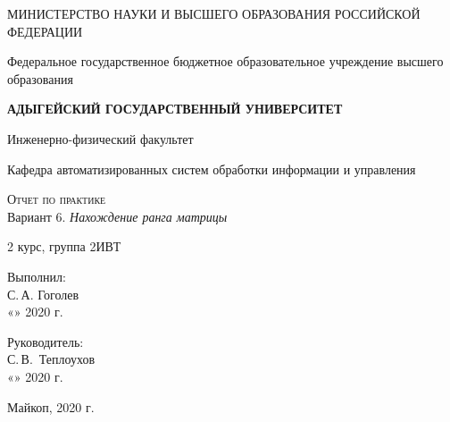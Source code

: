 \documentclass[12pt,a4paper]{scrartcl}
\begin{document}
	\begin{titlepage}
		\begin{center}
			\large
			МИНИСТЕРСТВО НАУКИ И ВЫСШЕГО ОБРАЗОВАНИЯ РОССИЙСКОЙ ФЕДЕРАЦИИ
			
			Федеральное государственное бюджетное образовательное учреждение высшего образования
			
			\textbf{АДЫГЕЙСКИЙ ГОСУДАРСТВЕННЫЙ УНИВЕРСИТЕТ}
			\vspace{0.25cm}
			
			Инженерно-физический факультет
			
			Кафедра автоматизированных систем обработки информации и управления
			\vfill

			\vfill
			
			\textsc{Отчет по практике}\\[5mm]
			
			{\LARGE Вариант 6. \textit{Нахождение ранга матрицы }}
			\bigskip
			
			2 курс, группа 2ИВТ
		\end{center}
		\vfill
		
		\newlength{\ML}
		\hfill\begin{minipage}{0.5\textwidth}
			Выполнил:\\
			\underline{\hspace{\ML}} С.\,А. Гоголев\\
			«\underline{\hspace{0.7cm}}» \underline{\hspace{2cm}} 2020 г.
		\end{minipage}%
		\bigskip
		
		\hfill\begin{minipage}{0.5\textwidth}
			Руководитель:\\
			\underline{\hspace{\ML}} С.\,В.~Теплоухов\\
			«\underline{\hspace{0.7cm}}» \underline{\hspace{2cm}} 2020 г.
		\end{minipage}%
		\vfill
		
		\begin{center}
			Майкоп, 2020 г.
		\end{center}
	\end{titlepage}
	\tableofcontents{}
\clearpage
\end{document}
